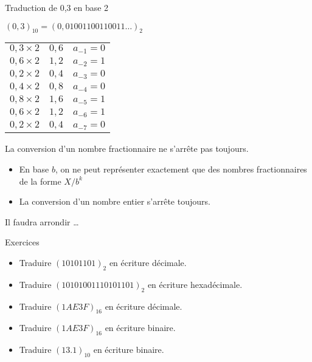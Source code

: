 \begin{frame}{Traduction de 0,3 en base 2}


  \begin{exampleblock}{$(0,3)_{10} = (0,01001100110011 \ldots)_2$}
    \begin{tabular}{r@{ = }ll}

      $0,3\times2$         & $0,6$ & $a_{-1} = 0$ \\
      $0,6\times2$         & $1,2$ & $a_{-2} = 1$ \\
      \alert{$0,2\times2$} & $0,4$ & $a_{-3} = 0$ \\
      $0,4\times2$         & $0,8$ & $a_{-4} = 0$ \\
       $0,8\times2$        & $1,6$ & $a_{-5} = 1$ \\
       $0,6\times2$        & $1,2$ & $a_{-6} = 1$ \\
      \alert{$0,2\times2$} & $0,4$ & $a_{-7} = 0$ \\

    \end{tabular}
  \end{exampleblock}

  \begin{alertblock}{La conversion d’un nombre fractionnaire ne s’arrête pas toujours.}
    \begin{itemize}
    \item En base $b$,  on ne peut représenter exactement que des nombres fractionnaires de la forme $X/b^k$
    \item  La conversion d’un nombre entier s’arrête toujours.
    \end{itemize}
  \end{alertblock}
  \begin{alertblock}{Il faudra arrondir \dots}
  \end{alertblock}
\end{frame}



\begin{frame}{Exercices}
  \begin{itemize}
  \item Traduire $(10101101)_2$ en écriture décimale.
  \item Traduire $(10101001110101101)_2$ en écriture hexadécimale.
  \item Traduire $(1AE3F)_{16}$ en écriture décimale.
  \item Traduire $(1AE3F)_{16}$ en écriture binaire.
  \item Traduire $(13.1)_{10}$ en écriture binaire.
  \end{itemize}
\end{frame}


